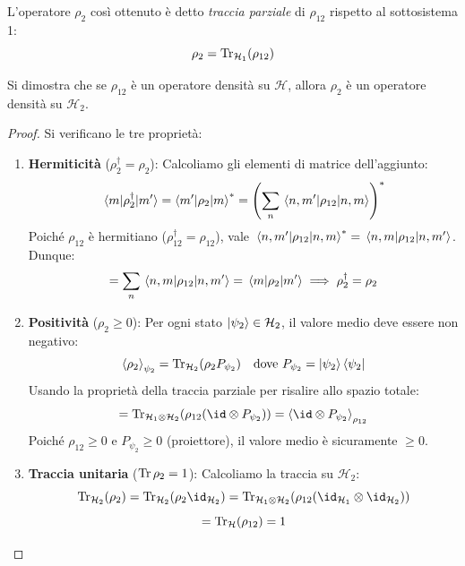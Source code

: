 \begin{definition}
    L'operatore \( \rho_2 \) così ottenuto è detto \textit{traccia parziale} di \( \rho_{12} \) rispetto al sottosistema 1:
    \begin{equation}
        \rho_2 = \Tr_{\mathcal{H}_1}(\rho_{12})
    \end{equation}
\end{definition}

Si dimostra che se \( \rho_{12} \) è un operatore densità su \( \mathcal{H} \), allora \( \rho_2 \) è un operatore densità su \( \mathcal{H}_2 \).

\begin{proof} Si verificano le tre proprietà:
    \begin{enumerate}
        \item \textbf{Hermiticità} ($\rho_2^\dagger = \rho_2$):
        Calcoliamo gli elementi di matrice dell'aggiunto:
        \[
            \mel{m}{\rho_2^\dagger}{m'} = \braket{m'}{\rho_2|m}^* = \left( \sum_n \mel{n,m'}{\rho_{12}}{n,m} \right)^*
        \]
        Poiché $\rho_{12}$ è hermitiano ($\rho_{12}^\dagger = \rho_{12}$), vale $\mel{n,m'}{\rho_{12}}{n,m}^* = \mel{n,m}{\rho_{12}}{n,m'}$. Dunque:
        \[
            = \sum_n \mel{n,m}{\rho_{12}}{n,m'} = \mel{m}{\rho_2}{m'} \implies \rho_2^\dagger = \rho_2
        \]

        \item \textbf{Positività} ($\rho_2 \ge 0$):
        Per ogni stato $\ket{\psi_2} \in \mathcal{H}_2$, il valore medio deve essere non negativo:
        \[
            \ev{\rho_2}_{\psi_2} = \Tr_{\mathcal{H}_2}(\rho_2 P_{\psi_2}) \quad \text{dove } P_{\psi_2} = \ket{\psi_2}\bra{\psi_2}
        \]
        Usando la proprietà della traccia parziale per risalire allo spazio totale:
        \[
            = \Tr_{\mathcal{H}_1 \otimes \mathcal{H}_2} (\rho_{12} (\id \otimes P_{\psi_2})) = \ev{\id \otimes P_{\psi_2}}_{\rho_{12}}
        \]
        Poiché $\rho_{12} \ge 0$ e $P_{\psi_2} \ge 0$ (proiettore), il valore medio è sicuramente $\ge 0$.

        \item \textbf{Traccia unitaria} ($\Tr \rho_2 = 1$):
        Calcoliamo la traccia su $\mathcal{H}_2$:
        \[
            \Tr_{\mathcal{H}_2}(\rho_2) = \Tr_{\mathcal{H}_2}(\rho_2 \id_{\mathcal{H}_2}) = \Tr_{\mathcal{H}_1 \otimes \mathcal{H}_2}(\rho_{12} (\id_{\mathcal{H}_1} \otimes \id_{\mathcal{H}_2}))
        \]
        \[
            = \Tr_{\mathcal{H}}(\rho_{12}) = 1
        \]
    \end{enumerate}
\end{proof}

